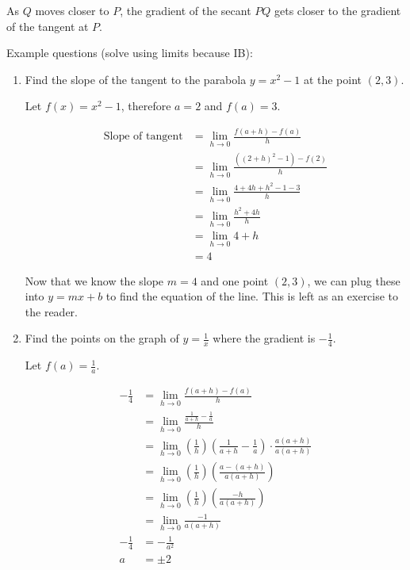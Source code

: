 \documentclass[12pt]{article}
\begin{document}
As $Q$ moves closer to $P$, the gradient of the secant $PQ$ gets closer to the gradient of the tangent at $P$.

\noindent Example questions (solve using limits because IB):

\begin{enumerate}
    \item Find the slope of the tangent to the parabola $y=x^2-1$ at the point $(2, 3)$.

    Let $f(x) = x^2 - 1$, therefore $a = 2$ and $f(a) = 3$.

    \begin{align*}
        \text{Slope of tangent} &= \lim_{h \to 0} \frac{f(a + h) - f(a)}{h} \\[6pt]
        &= \lim_{h \to 0} \frac{\left( (2 + h)^2 - 1 \right) - f(2)}{h} \\[6pt]
        &= \lim_{h \to 0} \frac{4 + 4h + h^2 - 1 - 3}{h} \\[6pt]
        &= \lim_{h \to 0} \frac{h^2 + 4h}{h} \\[6pt]
        &= \lim_{h \to 0} 4 + h \\
        &= 4
    \end{align*}

    Now that we know the slope $m = 4$ and one point $(2, 3)$, we can plug these into $y = mx + b$ to find the equation of the line. This is left as an exercise to the reader.

    \item Find the points on the graph of $y = \frac{1}{x}$ where the gradient is $-\frac{1}{4}$.

    Let $f(a) = \frac{1}{a}$.

    \begin{align*}
        -\frac{1}{4} &= \lim_{h \to 0} \frac{f(a + h) - f(a)}{h} \\[6pt]
        &= \lim_{h \to 0} \frac{\frac{1}{a + h} - \frac{1}{a}}{h} \\[6pt]
        &= \lim_{h \to 0} \left( \frac{1}{h} \right) \left( \frac{1}{a+h} - \frac{1}{a} \right) \cdot \frac{a(a+h)}{a(a+h)} \\[6pt]
        &= \lim_{h \to 0} \left( \frac{1}{h} \right) \left( \frac{a - (a + h)}{a(a+h)} \right) \\[6pt]
        &= \lim_{h \to 0} \left( \frac{1}{h} \right) \left( \frac{-h}{a(a+h)} \right) \\[6pt]
        &= \lim_{h \to 0} \frac{-1}{a(a+h)} \\[6pt]
        -\frac{1}{4} &= -\frac{1}{a^2} \\
        a &= \pm 2
    \end{align*}


\end{enumerate}
\end{document}
